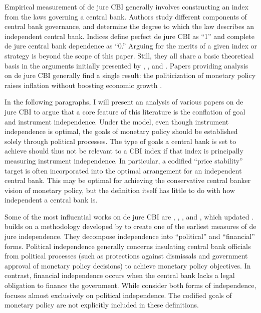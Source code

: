 \documentclass[12pt,a4paper]{article}
\begin{document}
\begin{doublespace}
Empirical measurement of de jure CBI generally involves constructing an index from the laws governing a central bank. Authors study different components of central bank governance, and determine the degree to which the law describes an independent central bank. Indices define perfect de jure CBI as ``1'' and complete de jure central bank dependence as ``0.'' Arguing for the merits of a given index or strategy is beyond the scope of this paper. Still, they all share a basic theoretical basis in the arguments initially presented by \textcite{kydland_rules_1977}, \textcite{barro_rules_1983}, and \textcite{rogoff_optimal_1985}. Papers providing analysis on de jure CBI generally find a single result: the politicization of monetary policy raises inflation without boosting economic growth \parencite[4]{posen_introduction_2025}. 

In the following paragraphs, I will present an analysis of various papers on de jure CBI to argue that a core feature of this literature is the conflation of goal and instrument independence. Under the \textcite{debelle_how_1994} model, even though instrument independence is optimal, the goals of monetary policy should be established solely through political processes. The type of goals a central bank is set to achieve should thus not be relevant to a CBI index if that index is principally measuring instrument independence. In particular, a codified ``price stability'' target is often incorporated into the optimal arrangement for an independent central bank. This may be optimal for achieving the conservative central banker vision of monetary policy, but the definition itself has little to do with how independent a central bank is.

Some of the most influential works on de jure CBI are \textcite{alesina_macroeconomics_1988},  \textcite{grilli_political_1991}, \textcite{alesina_central_1993}, and \textcite{bade_central_1988}, which updated \textcite{bade_central_1982}. \textcite{alesina_macroeconomics_1988} builds on a methodology developed by \textcite{bade_central_1982} to create one of the earliest measures of de jure independence. They decompose independence into ``political'' and ``financial'' forms. Political independence generally concerns insulating central bank officials from political processes (such as protections against dismissals and government approval of monetary policy decisions) to achieve monetary policy objectives. In contrast, financial independence occurs when the central bank lacks a legal obligation to finance the government. While \textcite{bade_central_1988} consider both forms of independence, \textcite{alesina_macroeconomics_1988} focuses almost exclusively on political independence. The codified goals of monetary policy are not explicitly included in these definitions.



\end{doublespace}
\end{document}
